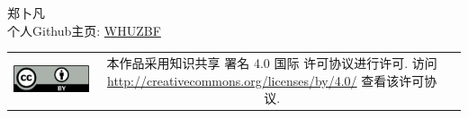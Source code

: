 \begin{titlepage}
\begin{flushleft} \small
	郑卜凡 \\
	个人Github主页: \href{https://github.com/WHUZBF}{WHUZBF} \\
\end{flushleft}
\vspace{1.5em}
\begin{tabular*}{\textwidth}{ccc}
	\includegraphics{ccby.png}
	& \begin{minipage}[b]{0.6\textwidth}
		\small\sffamily
		本作品采用知识共享 署名 4.0 国际 许可协议进行许可. 访问 \url{http://creativecommons.org/licenses/by/4.0/} 查看该许可协议.
	\end{minipage}
\end{tabular*}

\cleardoublepage
\end{titlepage}
